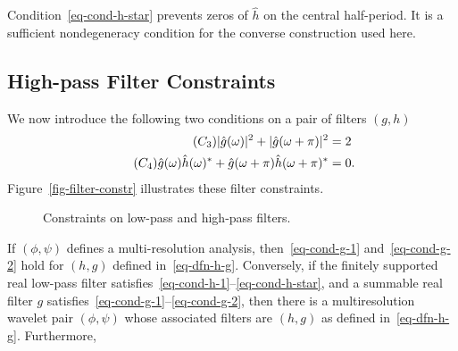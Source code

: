 Condition~\eqref{eq-cond-h-star} prevents zeros of $\hat h$ on the central half-period. It is a sufficient nondegeneracy condition for the converse construction used here.

\subsection{High-pass Filter Constraints}

We now introduce the following two conditions on a pair of filters $(g,h)$
\begin{align}
	\label{eq-cond-g-1}\tag{$C_3$}  |\hat g(\omega)|^2 + |\hat g(\omega+\pi)|^2&=2  \\
	\label{eq-cond-g-2}\tag{$C_4$}   \hat g(\omega) \hat h(\omega)^* + \hat g(\omega+\pi) \hat h(\omega+\pi)^*&=0.
\end{align}
Figure~\ref{fig-filter-constr} illustrates these filter constraints.

\begin{figure}[tbp]
\centering
{}
\caption{Constraints on low-pass and high-pass filters.}
\label{fig-filter-constr}
\label{fig-filters-complements}
\end{figure}



\begin{thm}\label{thm-wave-h}
	If $(\phi,\psi)$ defines a multi-resolution analysis, then~\eqref{eq-cond-g-1} and~\eqref{eq-cond-g-2} hold for $(h,g)$ defined in~\eqref{eq-dfn-h-g}.
	Conversely, if the finitely supported real low-pass filter satisfies~\eqref{eq-cond-h-1}--\eqref{eq-cond-h-star}, and a summable real filter $g$ satisfies~\eqref{eq-cond-g-1}--\eqref{eq-cond-g-2}, then there is a multiresolution wavelet pair $(\phi,\psi)$ whose associated filters are $(h,g)$ as defined in~\eqref{eq-dfn-h-g}. Furthermore,
\end{thm}

